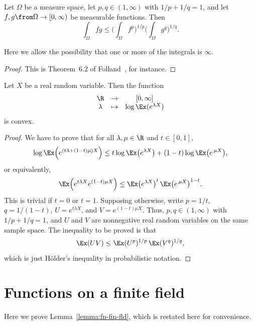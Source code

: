 \begin{thm}%
%
Let $\Omega$ be a measure space, let $p, q \in (1, \infty)$ with $1/p + 1/q
= 1$, and let $f, g \from \Omega \to [0, \infty)$ be measurable functions.  Then
\[
\int_\Omega fg
\leq
\Biggl( \int_\Omega f^p \Biggr)^{1/p}
\Biggl( \int_\Omega g^q \Biggr)^{1/q}.
\] 
\end{thm}

Here we allow the possibility that one or more of the integrals is
$\infty$.

\begin{proof}
This is Theorem~6.2 of Folland~\cite{FollRA}, for instance.
\end{proof}

\begin{cor}
Let $X$ be a real random variable.  Then the function
\[
\begin{array}{ccc}
\R      &\to            &[0, \infty]    \\
\lambda &\mapsto        &\log\Ex(e^{\lambda X})
\end{array}
\]
is convex.
\end{cor}

\begin{proof}
We have to prove that for all $\lambda, \mu \in \R$ and $t \in [0, 1]$,
\[
\log\Ex\Bigl(e^{(t\lambda + (1 - t)\mu)X}\Bigr)
\leq
t\log\Ex\bigl(e^{\lambda X}\bigr) + (1 - t)\log\Ex\bigl(e^{\,\mu X}\bigr),
\]
or equivalently,
\[
\Ex\Bigl(e^{t\lambda X} e^{(1 - t)\mu X}\Bigr)
\leq
\Ex\bigl(e^{\lambda X}\bigr)^t \, \Ex\bigl(e^{\,\mu X}\bigr)^{1 - t}.
\]
This is trivial if $t = 0$ or $t = 1$.  Supposing otherwise, write $p =
1/t$, $q = 1/(1 - t)$, $U = e^{t \lambda X}$, and $V = e^{(1 - t)\mu X}$.
Thus, $p, q \in (1, \infty)$ with $1/p + 1/q = 1$, and $U$ and $V$ are
nonnegative real random variables on the same sample space.  The
inequality to be proved is that
\[
\Ex(UV) \leq \Ex(U^p)^{1/p} \, \Ex(V^q)^{1/q},
\]
which is just H\"older's inequality in probabilistic notation.
\end{proof}


\section{Functions on a finite field}


Here we prove Lemma~\ref{lemma:fn-fin-fld}, which is restated here for
convenience.

